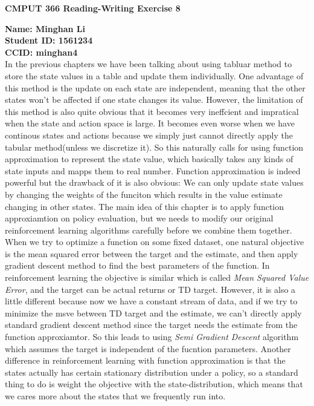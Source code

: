 \documentclass[12pt,a4paper]{article}
\begin{document}
\centerline{\large{\textbf{CMPUT 366 Reading-Writing Exercise 8}}}
\noindent \textbf{Name: Minghan Li}\\
\textbf{Student ID: 1561234}\\
\textbf{CCID: minghan4}\\

In the previous chapters we have been talking about using tabluar method to store the state values in a table and update them individually. One advantage of this method is the update on each state are independent, meaning that the other states won't be affected if one state changes its value. However, the limitation of this method is also quite obvious that it becomes very ineffcient and impratical when the state and action space is large. It becomes even worse when we have continous states and actions because we simply just cannot directly apply the tabular method(unless we discretize it). So this naturally calls for using function approximation to represent the state value, which basically takes any kinds of state inputs and mapps them to real number. Function approximation is indeed powerful but the drawback of it is also obvious: We can only update state values by changing the weights of the funciton which results in the value estimate changing in other states. The main idea of this chapter is to apply function approxiamtion on policy evaluation, but we needs to modify our original reinforcement learning algorithms carefully before we combine them together.\\

When we try to optimize a function on some fixed dataset, one natural objective is the mean squared error between the target and the estimate, and then apply gradient descent method to find the best parameters of the function. In reinforcement learning the objective is similar which is called \textit{Mean Squared Value Error}, and the target can be actual returns or TD target. However, it is also a little different because now we have a constant stream of data, and if we try to minimize the msve between TD target and the estimate, we can't directly apply standard gradient descent method since the target needs the estimate from the function approxiamtor. So this leads to using \textit{Semi Gradient Descent} algorithm which assumes the target is independent of the fucntion parameters. Another difference in reinforcement learning with function approximation is that the states actually has certain stationary distribution under a policy, so a standard thing to do is weight the objective with the state-distribution, which means that we cares more about the states that we frequently run into.\\
\end{document}
